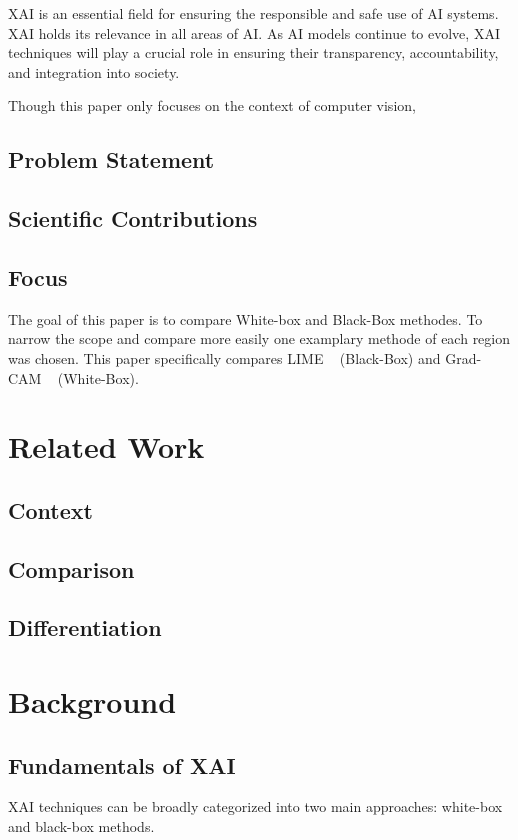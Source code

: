 \documentclass{article}
\begin{document}
XAI is an essential field for ensuring the responsible and safe use of AI systems. XAI holds its relevance in all areas of AI. As AI models continue to evolve, XAI techniques will play a crucial role in ensuring their transparency, accountability, and integration into society.

Though this paper only focuses on the context of computer vision,


\subsection{Problem Statement}
\subsection{Scientific Contributions}

\subsection{Focus}
The goal of this paper is to compare White-box and Black-Box methodes. To narrow the scope and compare more easily one examplary methode of each region was chosen. This paper specifically compares LIME ~\cite{ribeiro2016why} (Black-Box) and Grad-CAM ~\cite{Selvaraju_2019} (White-Box).


\section{Related Work}
\subsection{Context}
\subsection{Comparison}
\subsection{Differentiation}

\section{Background}

\subsection{Fundamentals of XAI}
XAI techniques can be broadly categorized into two main approaches: white-box and black-box methods.
\end{document}
